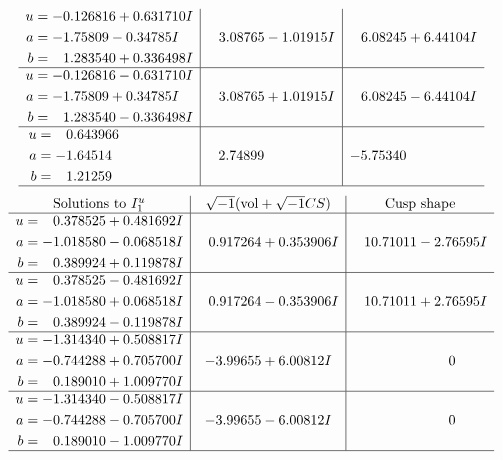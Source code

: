 \documentclass[1p]{elsarticle_modified}
\theoremstyle{definition}
\newcommand{\I}{\sqrt{-1}}
\begin{document}
$$\begin{array}{c|c|c}
\begin{aligned}
u &= -0.126816 + 0.631710 I \\
a &= -1.75809 - 0.34785 I \\
b &= \phantom{-}1.283540 + 0.336498 I\end{aligned}
 & \phantom{-}3.08765 - 1.01915 I & \phantom{-}6.08245 + 6.44104 I \\ \hline\begin{aligned}
u &= -0.126816 - 0.631710 I \\
a &= -1.75809 + 0.34785 I \\
b &= \phantom{-}1.283540 - 0.336498 I\end{aligned}
 & \phantom{-}3.08765 + 1.01915 I & \phantom{-}6.08245 - 6.44104 I \\ \hline\begin{aligned}
u &= \phantom{-}0.643966\phantom{ +0.000000I} \\
a &= -1.64514\phantom{ +0.000000I} \\
b &= \phantom{-}1.21259\phantom{ +0.000000I}\end{aligned}
 & \phantom{-}2.74899\phantom{ +0.000000I} & -5.75340\phantom{ +0.000000I}\\
 \hline 
 \end{array}$$\newpage$$\begin{array}{c|c|c}  
\text{Solutions to }I^u_{1}& \I (\text{vol} + \sqrt{-1}CS) & \text{Cusp shape}\\
 \hline 
\begin{aligned}
u &= \phantom{-}0.378525 + 0.481692 I \\
a &= -1.018580 - 0.068518 I \\
b &= \phantom{-}0.389924 + 0.119878 I\end{aligned}
 & \phantom{-}0.917264 + 0.353906 I & \phantom{-}10.71011 - 2.76595 I \\ \hline\begin{aligned}
u &= \phantom{-}0.378525 - 0.481692 I \\
a &= -1.018580 + 0.068518 I \\
b &= \phantom{-}0.389924 - 0.119878 I\end{aligned}
 & \phantom{-}0.917264 - 0.353906 I & \phantom{-}10.71011 + 2.76595 I \\ \hline\begin{aligned}
u &= -1.314340 + 0.508817 I \\
a &= -0.744288 + 0.705700 I \\
b &= \phantom{-}0.189010 + 1.009770 I\end{aligned}
 & -3.99655 + 6.00812 I & \phantom{-0.000000 } 0 \\ \hline\begin{aligned}
u &= -1.314340 - 0.508817 I \\
a &= -0.744288 - 0.705700 I \\
b &= \phantom{-}0.189010 - 1.009770 I\end{aligned}
 & -3.99655 - 6.00812 I & \phantom{-0.000000 } 0\\
 \hline 
 \end{array}$$\newpage\newpage\renewcommand{\arraystretch}{1}
\end{document}
